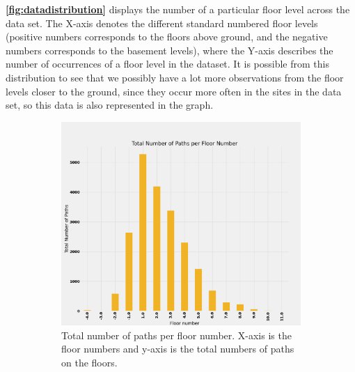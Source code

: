 \textbf{\autoref{fig:datadistribution}} displays the number of a particular floor level across the data set. The X-axis denotes the different standard numbered floor levels (positive numbers corresponds to the floors above ground, and the negative numbers corresponds to the basement levels), where the Y-axis describes the number of occurrences of a floor level in the dataset. It is possible from this distribution to see that we possibly have a lot more observations from the floor levels closer to the ground, since they occur more often in the sites in the data set, so this data is also represented in the graph. %

\begin{figure}[H]
     \centering
     \begin{subfigure}[b]{0.49\textwidth}
         \centering
         \includegraphics[width=\textwidth]{Images/ProblemAnalysis/datadistribution2.png}
         \caption{Total number of paths per floor number. X-axis is the floor numbers and y-axis is the total numbers of paths on the floors.}
         \label{fig:totalpath}
     \end{subfigure}
     \hfill
     \begin{subfigure}[b]{0.49\textwidth}
         \centering

\end{subfigure}
\end{figure}
